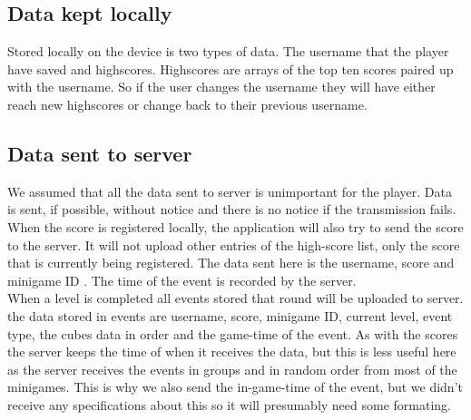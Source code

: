 \subsection{Data kept locally}
Stored locally on the device is two types of data.
The username that the player have saved and highscores.
Highscores are arrays of the top ten scores paired up with the username.
So if the user changes the username they will have either reach new highscores
or change back to their previous username.

\subsection{Data sent to server}
We assumed that all the data sent to server is unimportant for the player. Data is sent, if possible, without notice and there is no notice if the transmission fails.
When the score is registered locally, the application will also try to send the score to the server. It will not upload other entries of the high-score list, only the score that is currently being registered. The data sent here is the username, score and minigame ID . The time of the event is recorded by the server. \\
When a level is completed all events stored that round will be uploaded to server. the data stored in events are username, score, minigame ID, current level, event type, the cubes data in order and the game-time of the event. As with the scores the server keeps the time of when it receives the data, but this is less useful here as the server receives the events in groups and in random order from most of the minigames. This is why we also send the in-game-time of the event, but we didn't receive any specifications about this so it will presumably need some formating. 